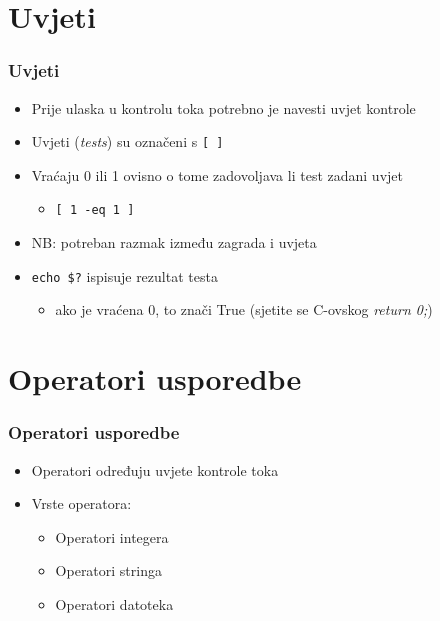 \documentclass{beamer}
\newcommand{\shell}[1]{\texttt{#1}}
\begin{document}
\section{Uvjeti}
\begin{frame}
\frametitle{Uvjeti}
\begin{itemize}
	\item Prije ulaska u kontrolu toka potrebno je navesti uvjet kontrole
	\item Uvjeti (\textit{tests}) su označeni s \shell{[ ]}
	\item Vraćaju 0 ili 1 ovisno o tome zadovoljava li test zadani uvjet
	\begin{itemize}
		\item \shell{[ 1 -eq 1 ]}
	\end{itemize}
	\item NB: potreban razmak između zagrada i uvjeta
	\item \shell{echo \$?} ispisuje rezultat testa
	\begin{itemize}
		\item ako je vraćena 0, to znači True (sjetite se C-ovskog \textit{return 0;})
	\end{itemize}
\end{itemize}
\end{frame}

\section{Operatori usporedbe}
\begin{frame}
\frametitle{Operatori usporedbe}
\begin{itemize}
	\item Operatori određuju uvjete kontrole toka
	\item Vrste operatora:
	\begin{itemize}
		\item Operatori integera
		\item Operatori stringa
		\item Operatori datoteka		
	\end{itemize}
\end{itemize}
\end{frame}
\end{document}
